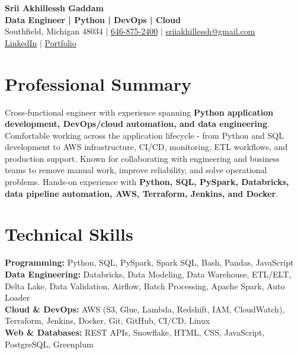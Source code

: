 \documentclass[letterpaper,10pt]{article}
\begin{document}
\fontsize{9.35pt}{10.45pt}\selectfont

\begin{center}
    {\LARGE \textbf{Srii Akhillessh Gaddam}} \\[-1pt]
    \textbf{Data Engineer | Python | DevOps | Cloud} \\[2pt]
    Southfield, Michigan 48034 $|$
    \href{tel:6468752400}{646-875-2400} $|$
    \href{mailto:sriiakhillessh@gmail.com}{sriiakhillessh@gmail.com} \\[1pt]
    \href{https://www.linkedin.com/in/srii-akhiilessh-gaddam-b48668191/}{LinkedIn} $|$
    \href{https://sriiakhillesshg.github.io/portfolio/}{Portfolio}
\end{center}
\vspace{-8pt}

\section{Professional Summary}
\small{Cross-functional engineer with experience spanning \textbf{Python application development, DevOps/cloud automation, and data engineering}. Comfortable working across the application lifecycle - from Python and SQL development to AWS infrastructure, CI/CD, monitoring, ETL workflows, and production support. Known for collaborating with engineering and business teams to remove manual work, improve reliability, and solve operational problems. Hands-on experience with \textbf{Python, SQL, PySpark, Databricks, data pipeline automation, AWS, Terraform, Jenkins, and Docker}.}

\section{Technical Skills}
\small{
\textbf{Programming:} Python, SQL, PySpark, Spark SQL, Bash, Pandas, JavaScript \\
\textbf{Data Engineering:} Databricks, Data Modeling, Data Warehouse, ETL/ELT, Delta Lake, Data Validation, Airflow, Batch Processing, Apache Spark, Auto Loader \\
\textbf{Cloud \& DevOps:} AWS (S3, Glue, Lambda, Redshift, IAM, CloudWatch), Terraform, Jenkins, Docker, Git, GitHub, CI/CD, Linux \\
\textbf{Web \& Databases:} REST APIs, Snowflake, HTML, CSS, JavaScript, PostgreSQL, Greenplum
}
\end{document}
